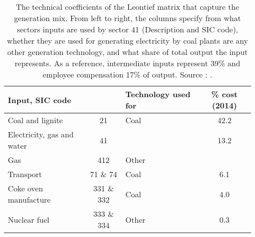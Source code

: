 \documentclass[12pt,english]{article}
\begin{document}
\begin{table}[ht]
	\centering
	\begin{tabular}{lclc}
		\toprule
		\multicolumn{2}{l}{Input, SIC code}	& Technology used for  &  \% cost (2014) \\ 
		\midrule
		Coal and lignite & 21 &  Coal &  42.2    \\
	 	Electricity, gas and water & 41 &  & 13.2     \\
		Gas &412 & Other &     \\
		Transport &71 \& 74 &  Coal  &   6.1   \\
		Coke oven manufacture & 331 \& 332 & Coal &  4.0 \\
		Nuclear fuel & 333 \& 334 & Other & 0.3   \\
		\bottomrule
	\end{tabular}
	\caption{\label{GenerationMixcoefficients}The technical coefficients of the Leontief matrix that capture the generation mix. From left to right, the columns specify from what sectors inputs are used by sector 41 (Description and SIC code), whether they are used for generating electricity by coal plants are any other generation technology, and what share of total output the input represents. As a reference, intermediate inputs represent 39\% and employee compensation 17\% of output. Source : \cite{IOT2014}.}
\end{table}
\end{document}

